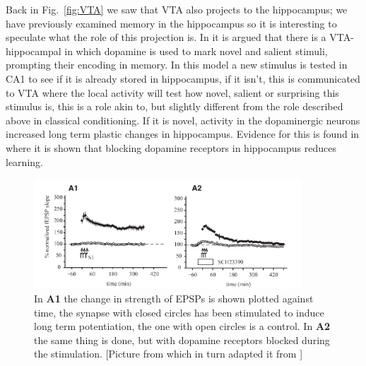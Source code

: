 \documentclass[11pt,a4paper]{scrartcl}
\begin{document}
Back in Fig.~\ref{fig:VTA} we saw that VTA also projects to the
hippocampus; we have previously examined memory in the hippocampus so
it is interesting to speculate what the role of this projection is. In
\cite{LismanGrace2005a} it is argued that there is a VTA-hippocampal
in which dopamine is used to mark novel and salient stimuli, prompting
their encoding in memory. In this model a new stimulus is tested in
CA1 to see if it is already stored in hippocampus, if it isn't, this
is communicated to VTA where the local activity will test how novel,
salient or surprising this stimulus is, this is a role akin to, but
slightly different from the role described above in classical
conditioning. If it is novel, activity in the dopaminergic neurons
increased long term plastic changes in hippocampus. Evidence for this
is found in \cite{MorrisEtAl2003a} where it is shown that blocking
dopamine receptors in hippocampus reduces learning.


\begin{figure}
\begin{center}
\includegraphics[width=10cm]{dopamine_learning.png}
\end{center}
\caption{In \textbf{A1} the change in strength of EPSPs is shown
  plotted against time, the synapse with closed circles has been
  stimulated to induce long term potentiation, the one with open
  circles is a control. In \textbf{A2} the same thing is done, but
  with dopamine receptors blocked during the stimulation. [Picture
    from \cite{LismanGrace2005a} which in turn adapted it from
    \cite{MorrisEtAl2003a}]\label{fig:hippocampus}}
\end{figure}
\end{document}
